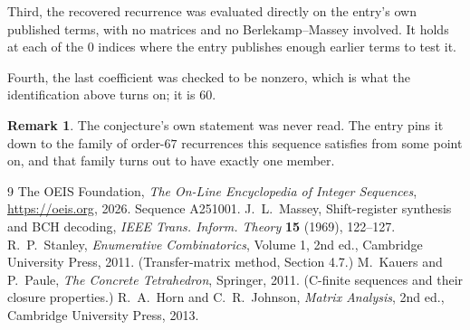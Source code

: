 \documentclass[11pt,a4paper]{article}
\theoremstyle{plain}
\theoremstyle{definition}
\newtheorem{remark}[theorem]{Remark}
\begin{document}
Third, the recovered recurrence was evaluated directly on the entry's own published terms, with
no matrices and no Berlekamp--Massey involved. It holds at each of the $0$ indices where
the entry publishes enough earlier terms to test it.

Fourth, the last coefficient was checked to be nonzero, which is what the identification above
turns on; it is $60$.

\begin{remark}
The conjecture's own statement was never read. The entry pins it down to the family of
order-$67$ recurrences this sequence satisfies from some point on, and that family turns
out to have exactly one member.
\end{remark}

\begin{thebibliography}{9}
 The OEIS Foundation, \emph{The On-Line Encyclopedia of Integer
Sequences}, \url{https://oeis.org}, 2026. Sequence A251001.
 J.~L.~Massey, Shift-register synthesis and BCH decoding, \emph{IEEE
Trans. Inform. Theory} \textbf{15} (1969), 122--127.
 R.~P.~Stanley, \emph{Enumerative Combinatorics}, Volume 1, 2nd ed.,
Cambridge University Press, 2011. (Transfer-matrix method, Section 4.7.)
 M.~Kauers and P.~Paule, \emph{The Concrete Tetrahedron}, Springer, 2011.
(C-finite sequences and their closure properties.)
 R.~A.~Horn and C.~R.~Johnson, \emph{Matrix Analysis}, 2nd ed., Cambridge
University Press, 2013.
\end{thebibliography}
\end{document}
